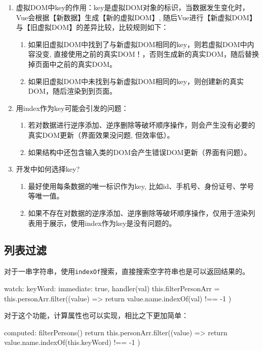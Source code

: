 \begin{enumerate}
    \item 虚拟DOM中key的作用：key是虚拟DOM对象的标识，当数据发生变化时，Vue会根据【新数据】生成【新的虚拟DOM】, 随后Vue进行【新虚拟DOM】与【旧虚拟DOM】的差异比较，比较规则如下：
    \begin{enumerate}
        \item 如果旧虚拟DOM中找到了与新虚拟DOM相同的key，则若虚拟DOM中内容没变, 直接使用之前的真实DOM！，否则生成新的真实DOM，随后替换掉页面中之前的真实DOM。
        \item 如果旧虚拟DOM中未找到与新虚拟DOM相同的key，则创建新的真实DOM，随后渲染到到页面。
    \end{enumerate}
    \item 用index作为key可能会引发的问题：
    \begin{enumerate}
        \item 若对数据进行逆序添加、逆序删除等破坏顺序操作，则会产生没有必要的真实DOM更新（界面效果没问题, 但效率低）。
        \item 如果结构中还包含输入类的DOM会产生错误DOM更新（界面有问题）。
    \end{enumerate}
    \item 开发中如何选择key?
    \begin{enumerate}
        \item 最好使用每条数据的唯一标识作为key, 比如id、手机号、身份证号、学号等唯一值。
        \item 如果不存在对数据的逆序添加、逆序删除等破坏顺序操作，仅用于渲染列表用于展示，使用index作为key是没有问题的。
    \end{enumerate}
\end{enumerate}
\subsection{列表过滤}
对于一串字符串，使用\verb|indexOf|搜索，直接搜索空字符串也是可以返回结果的。

\begin{js}
watch: {
    keyWord: {
        immediate: true,
        handler(val) {
            this.filterPersonArr = this.personArr.filter((value) => {
                return value.name.indexOf(val) !== -1
            })
        }
    }
}
\end{js}

对于这个功能，计算属性也可以实现，相比之下更加简单：

\begin{js}
computed: {
    filterPersons() {
        return this.personArr.filter((value) => {
            return value.name.indexOf(this.keyWord) !== -1
        })
    }
}
\end{js}

